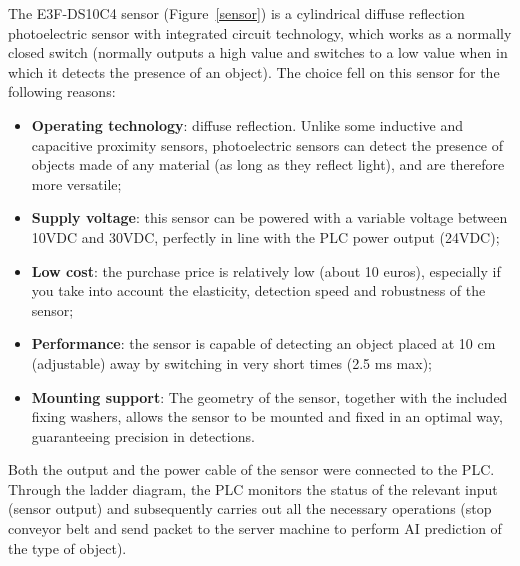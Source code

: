 \documentclass[a4paper,11pt]{report}
\theoremstyle{definition}
\theoremstyle{plain}
\begin{document}
            The E3F-DS10C4 sensor (Figure~\ref{sensor}) is a cylindrical diffuse reflection photoelectric sensor with integrated circuit technology, which works as a normally closed switch (normally outputs a high value and switches to a low value when in which it detects the presence of an object). The choice fell on this sensor for the following reasons:
            \begin{itemize}
                \item \textbf{Operating technology}: diffuse reflection. Unlike some inductive and capacitive proximity sensors, photoelectric sensors can detect the presence of objects made of any material (as long as they reflect light), and are therefore more versatile;
                \item \textbf{Supply voltage}: this sensor can be powered with a variable voltage between 10VDC and 30VDC, perfectly in line with the PLC power output (24VDC);
                \item \textbf{Low cost}: the purchase price is relatively low (about 10 euros), especially if you take into account the elasticity, detection speed and robustness of the sensor;
                \item \textbf{Performance}: the sensor is capable of detecting an object placed at 10 cm (adjustable) away by switching in very short times (2.5 ms max);
                \item \textbf{Mounting support}: The geometry of the sensor, together with the included fixing washers, allows the sensor to be mounted and fixed in an optimal way, guaranteeing precision in detections.
            \end{itemize}
            Both the output and the power cable of the sensor were connected to the PLC. Through the ladder diagram, the PLC monitors the status of the relevant input (sensor output) and subsequently carries out all the necessary operations (stop conveyor belt and send packet to the server machine to perform AI prediction of the type of object).
\end{document}
